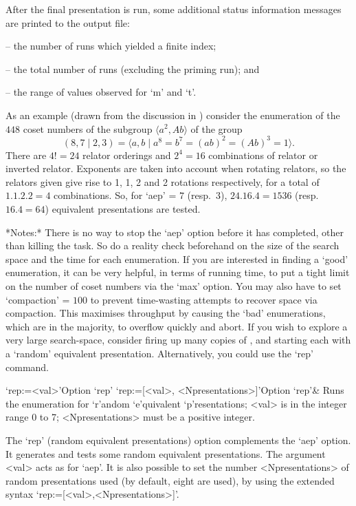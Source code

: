 After  the  final  presentation  is  run,   some   additional   status
information messages are printed to the {\ACE} output file:

\beginlist
\item{--}  the number of runs which yielded a finite index; 
\item{--}  the total number of runs (excluding the priming run); and 
\item{--}  the range of values observed for `m' and `t'.
\endlist

As an example (drawn from the discussion in \cite{HR99a}) consider the
enumeration   of   the   $448$   coset   numbers   of   the   subgroup
$\langle  a^2,Ab \rangle$ of the group
$$ (8,7 \mid 2,3) 
    = \langle a,b \mid a^8 = b^7 = (ab)^2 = (Ab)^3 = 1 \rangle. $$
There are $4!=24$  relator  orderings  and  $2^4=16$  combinations  of
relator or inverted relator. Exponents are  taken  into  account  when
rotating relators, so the relators given give rise to 1, 1,  2  and  2
rotations respectively, for a total of $1.1.2.2=4$  combinations.  So,
for  `aep'  =  $7$   (resp.~$3$),   $24.16.4=1536$   (resp.~$16.4=64$)
equivalent presentations are tested.

*Notes:*
There is no way to stop the `aep'  option  before  it  has  completed,
other than killing the task. So do a reality check beforehand  on  the
size of the search space and the time for each enumeration. If you are
interested in  finding  a  \lq{}good'  enumeration,  it  can  be  very
helpful, in terms of running time, to put a tight limit on the  number
of coset numbers via the `max'  option.  You  may  also  have  to  set
`compaction' = $100$ to prevent time-wasting attempts to recover space
via compaction. This maximises throughput  by  causing  the  \lq{}bad'
enumerations, which are in  the  majority,  to  overflow  quickly  and
abort. If you wish to explore  a  very  large  search-space,  consider
firing up many copies of {\ACE}, and starting each with a \lq{}random'
equivalent  presentation.  Alternatively,  you  could  use  the  `rep'
command.

\>`rep:=<val>'{Option `rep'}
\>`rep:=[<val>, <Npresentations>]'{Option `rep'}&
Runs  the enumeration for `r'andom `e'quivalent `p'resentations;
<val> is in the integer range 0 to 7;
<Npresentations> must be a positive integer.

The `rep' (random equivalent  presentations)  option  complements  the
`aep'  option.  It  generates  and  tests   some   random   equivalent
presentations. The argument <val>  acts  as  for  `aep'.  It  is  also
possible to set the number <Npresentations>  of  random  presentations
used (by default, eight  are  used),  by  using  the  extended  syntax
`rep:=[<val>,<Npresentations>]'.

